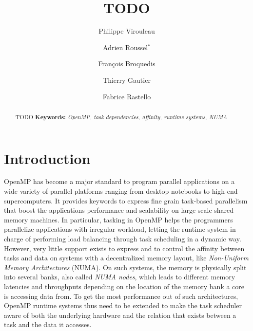 \documentclass{Styles/llncs}
\begin{document}
\title{TODO}
\author{
  Philippe Virouleau \and Adrien Roussel$^{*}$ \and François Broquedis \and Thierry Gautier \and Fabrice Rastello
 \vspace*{-1ex}}
\date{}
\maketitle

\begin{abstract}
  \vspace*{-5ex} TODO
\smallskip
  \noindent\textbf{Keywords:}
  \emph{
    OpenMP, task dependencies, affinity, runtime systems, NUMA
  }
\end{abstract}


\section{Introduction}

OpenMP has become a major standard to program parallel applications on a wide variety of parallel platforms ranging from desktop notebooks to high-end supercomputers. It provides keywords to express fine grain task-based parallelism that boost the applications performance and scalability on large scale shared memory machines. In particular, tasking in OpenMP helps the programmers parallelize applications with irregular workload, letting the runtime system in charge of performing load balancing through task scheduling in a dynamic way. However, very little support exists to express and to control the affinity between tasks and data on systems with a decentralized memory layout, like \emph{Non-Uniform Memory Architectures} (NUMA). On such systems, the memory is physically split into several banks, also called \emph{NUMA nodes}, which leads to different memory latencies and throughputs depending on the location of the memory bank a core is accessing data from. To get the most performance out of such architectures, OpenMP runtime systems thus need to be extended to make the task scheduler aware of both the underlying hardware and the relation that exists between a task and the data it accesses.
 
\end{document}
